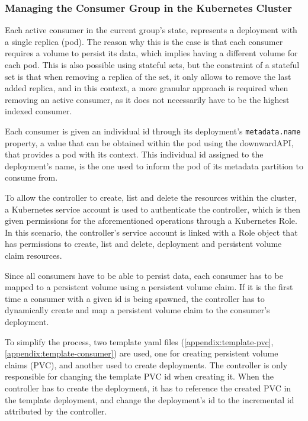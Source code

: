 \subsubsection{Managing the Consumer Group in the Kubernetes Cluster}

Each active consumer in the current group's state, represents a deployment with a single replica (pod). The reason why this is the case is that each consumer requires a volume to persist its data, which implies having a different volume for each pod. This is also possible using stateful sets, but the constraint of a stateful set is that when removing a replica of the set, it only allows to remove the last added replica, and in this context, a more granular approach is required when removing an active consumer, as it does not necessarily have to be the highest indexed consumer.

Each consumer is given an individual id through its deployment's \lstinline[language=Python]{metadata.name} property, a value that can be obtained within the pod using the downwardAPI, that provides a pod with its context. This individual id assigned to the deployment's name, is the one used to inform the pod of its metadata partition to consume from.

To allow the controller to create, list and delete the resources within the cluster, a Kubernetes service account is used to authenticate the controller, which is then given permissions for the aforementioned operations through a Kubernetes Role. In this scenario, the controller's service account is linked with a Role object that has permissions to create, list and delete, deployment and persistent volume claim resources.

Since all consumers have to be able to persist data, each consumer has to be mapped to a persistent volume using a persistent volume claim. If it is the first time a consumer with a given id is being spawned, the controller has to dynamically create and map a persistent volume claim to the consumer's deployment.

To simplify the process, two template yaml files (\ref{appendix:template-pvc}, \ref{appendix:template-consumer}) are used, one for creating persistent volume claims (PVC), and another used to create deployments. The controller is only responsible for changing the template PVC id when creating it. When the controller has to create the deployment, it has to reference the created PVC in the template deployment, and change the deployment's id to the incremental id attributed by the controller.

